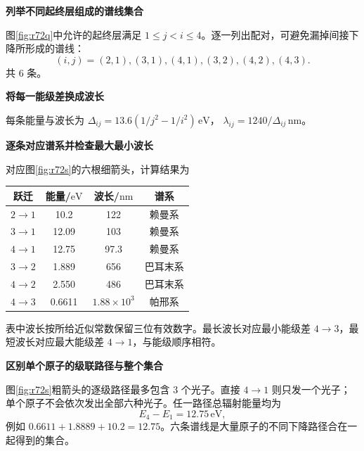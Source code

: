 \begin{solution}\textbf{列举不同起终层组成的谱线集合}\par\nobreak
图\ref{fig:r72q}中允许的起终层满足 \(1\le j<i\le4\)。逐一列出配对，可避免漏掉间接下降所形成的谱线：
\[
 (i,j)=(2,1),(3,1),(4,1),(3,2),(4,2),(4,3).
\]
共 \(\boxed{6\text{ 条}}\)。

\par\medskip{}\noindent\textbf{将每一能级差换成波长}\par\nobreak
每条能量与波长为
\(\Delta_{ij}=13.6(1/j^2-1/i^2)\,\mathrm{eV}\)，
\(\lambda_{ij}=1240/\Delta_{ij}\,\mathrm{nm}\)。



\par\medskip{}\noindent\textbf{逐条对应谱系并检查最大最小波长}\par\nobreak
对应图\ref{fig:r72s}的六根细箭头，计算结果为
\begin{center}
\begin{tabular}{cccc}\toprule
跃迁&能量/\(\mathrm{eV}\)&波长/\(\mathrm{nm}\)&谱系\\\midrule
\(2\to1\)&10.2&122&赖曼系\\
\(3\to1\)&12.09&103&赖曼系\\
\(4\to1\)&12.75&97.3&赖曼系\\
\(3\to2\)&1.889&656&巴耳末系\\
\(4\to2\)&2.550&486&巴耳末系\\
\(4\to3\)&0.6611&\(1.88\times10^3\)&帕邢系\\\bottomrule
\end{tabular}
\end{center}
表中波长按所给近似常数保留三位有效数字。最长波长对应最小能级差 \(4\to3\)，最短波长对应最大能级差 \(4\to1\)，与能级顺序相符。



\par\medskip{}\noindent\textbf{区别单个原子的级联路径与整个集合}\par\nobreak
图\ref{fig:r72s}粗箭头的逐级路径最多包含 \(\boxed{3\text{ 个光子}}\)。直接 \(4\to1\) 则只发一个光子；单个原子不会依次发出全部六种光子。任一路径总辐射能量均为
\[
 E_4-E_1=12.75\,\mathrm{eV},
\]
例如 \(0.6611+1.8889+10.2=12.75\)。六条谱线是大量原子的不同下降路径合在一起得到的集合。
\end{solution}

